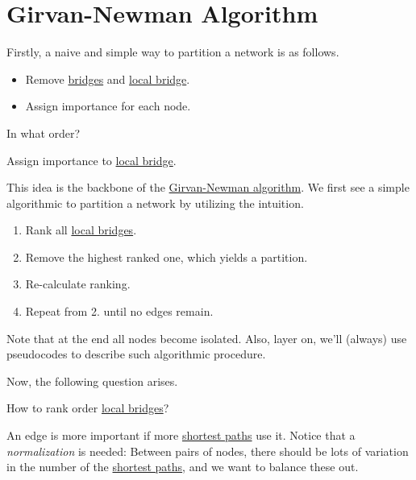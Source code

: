 \section{Girvan-Newman Algorithm}
Firstly, a naive and simple way to partition a network is as follows.
\begin{itemize}
	\item Remove \hyperref[def:bridge]{bridges} and \hyperref[def:local-bridge]{local bridge}.
	\item Assign importance for each node.
\end{itemize}

\begin{problem}
In what order?
\end{problem}
\begin{answer}
	Assign importance to \hyperref[def:local-bridge]{local bridge}.
\end{answer}

This idea is the backbone of the \hyperref[algo:Girvan-Newman-algorithm]{Girvan-Newman algorithm}. We first see a simple algorithmic to partition a network by utilizing the intuition.
\begin{enumerate}
	\item Rank all \hyperref[def:local-bridge]{local bridges}.
	\item Remove the highest ranked one, which yields a partition.
	\item Re-calculate ranking.
	\item Repeat from 2. until no edges remain.
\end{enumerate}

\begin{remark}
	Note that at the end all nodes become isolated. Also, layer on, we'll (always) use pseudocodes to describe such algorithmic procedure.
\end{remark}

Now, the following question arises.
\begin{problem}
How to rank order \hyperref[def:local-bridge]{local bridges}?
\end{problem}

\begin{intuition}
	An edge is more important if more \hyperref[def:shortest-path]{shortest paths} use it. Notice that a \emph{normalization} is needed: Between pairs of nodes, there should be lots of variation in the number of the \hyperref[def:shortest-path]{shortest paths}, and we want to balance these out.
\end{intuition}

